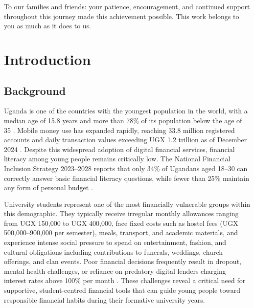 \documentclass[12pt]{report}
\begin{document}
To our families and friends: your patience, encouragement, and continued support
throughout this journey made this achievement possible. This work belongs to you as
much as it does to us.




\chapter{Introduction}
\label{ch:chapter-01}
 \renewcommand{\arraystretch}{1}  
\section{Background}

Uganda is one of the countries with the youngest population in the world, with a median
age of 15.8 years and more than 78\% of its population below the age of 35
\citep{UBOS2024}. Mobile money use has expanded rapidly, reaching 33.8 million
registered accounts and daily transaction values exceeding UGX 1.2 trillion as of
December 2024 \citep{BOU2024}. Despite this widespread adoption of digital financial
services, financial literacy among young people remains critically low. The National
Financial Inclusion Strategy 2023--2028 reports that only 34\% of Ugandans aged
18--30 can correctly answer basic financial literacy questions, while fewer than 25\%
maintain any form of personal budget \citep{MoFPED2023}.

University students represent one of the most financially vulnerable groups within this
demographic. They typically receive irregular monthly allowances ranging from UGX
150,000 to UGX 400,000, face fixed costs such as hostel fees (UGX 500,000--900,000
per semester), meals, transport, and academic materials, and experience intense social
pressure to spend on entertainment, fashion, and cultural obligations including
contributions to funerals, weddings, church offerings, and clan events. Poor financial
decisions frequently result in dropout, mental health challenges, or reliance on
predatory digital lenders charging interest rates above 100\% per month \citep{MoFPED2023}.
These challenges reveal a critical need for supportive, student-centred financial tools
that can guide young people toward responsible financial habits during their formative
university years.
\end{document}
